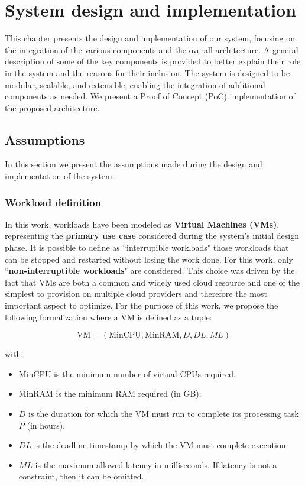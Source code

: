 \chapter{System design and implementation}
\label{cha:design}

This chapter presents the design and implementation of our system, focusing on the integration of the various components and the overall architecture. 
A general description of some of the key components is provided to better explain their role in the system and the reasons for their inclusion.
The system is designed to be modular, scalable, and extensible, enabling the integration of additional components as needed.
We present a Proof of Concept (PoC) implementation of the proposed architecture.

\section{Assumptions}

In this section we present the assumptions made during the design and implementation of the system. 

\subsection{Workload definition}
\label{sec:workload_definition}
In this work, workloads have been modeled as \textbf{Virtual Machines (VMs)}, representing the \textbf{primary use case} considered during the system's initial design phase. 
It is possible to define as ``interrupible workloads" those workloads that can be stopped and restarted without losing the work done. 
For this work, only ``\textbf{non-interruptible workloads}" are considered.
This choice was driven by the fact that VMs are both a common and widely used cloud resource and one of the simplest to provision on multiple cloud providers and therefore the most important aspect to optimize.
For the purpose of this work, we propose the following formalization where a VM is  defined as a tuple:

\[
\text{VM} = (\text{MinCPU}, \text{MinRAM}, D, DL, ML)
\]

with:
\begin{itemize}[itemsep=0.2pt, topsep=1pt]
    \item \( \text{MinCPU} \) is the minimum number of virtual CPUs required.
    \item \( \text{MinRAM} \) is the minimum RAM required (in GB).
    \item \( D \) is the duration for which the VM must run to complete its processing task \( P \) (in hours).
    \item \( DL \) is the deadline timestamp by which the VM must complete execution.
    \item \( ML \) is the maximum allowed latency in milliseconds. If latency is not a constraint, then it can be omitted. \\
\end{itemize}

